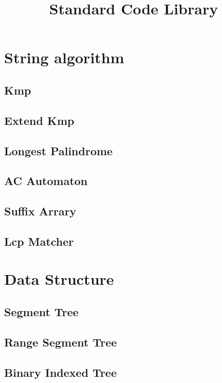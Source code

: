 \documentclass[twoside]{article}
\title{Standard Code Library}
\author{}
\newcommand\blankpage{ \null\thispagestyle{empty}\addtocounter{page}{-1}\newpage }
\begin{document}
	\maketitle
	\afterpage{\blankpage}

	\newpage
	\tableofcontents

	\newpage
	\section{String algorithm}
		\subsection{Kmp}
			
		\subsection{Extend Kmp}
			
		\subsection{Longest Palindrome}
			
		\subsection{AC Automaton}
			
		\subsection{Suffix Arrary}
		\subsection{Lcp Matcher}
	\newpage
	\section{Data Structure}
		\subsection{Segment Tree}
			
		\subsection{Range Segment Tree}
			
		\subsection{Binary Indexed Tree}
			
\end{document}
